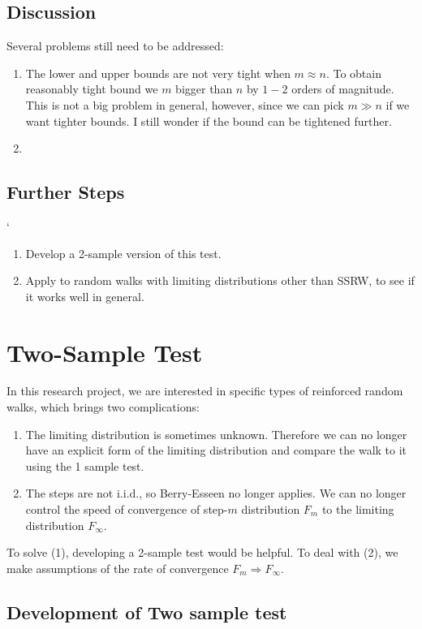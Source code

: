 \subsection*{Discussion}

Several problems still need to be addressed:
\begin{enumerate}
	\item The lower and upper bounds are not very tight when $m \approx n$. To obtain reasonably tight bound we $m$ bigger than $n$ by $1-2$ orders of magnitude. This is not a big problem in general, however, since we can pick $m \gg n$ if we want tighter bounds. I still wonder if the bound can be tightened further.
	\item 
\end{enumerate}


\subsection*{Further Steps}
`
\begin{enumerate}
	\item Develop a 2-sample version of this test.
	\item Apply to random walks with limiting distributions other than SSRW, to see if it works well in general.
\end{enumerate}

\section{Two-Sample Test}

In this research project, we are interested in specific types of reinforced random walks, which brings two complications:
\begin{enumerate}
	\item The limiting distribution is sometimes unknown. Therefore we can no longer have an explicit form of the limiting distribution and compare the walk to it using the 1 sample test.
	\item The steps are not i.i.d., so Berry-Esseen no longer applies. We can no longer control the speed of convergence of step-$m$ distribution $F_m$ to the limiting distribution $F_\infty $.
\end{enumerate}

To solve (1), developing a 2-sample test would be helpful. To deal with (2), we make assumptions of the rate of convergence $F_m \Rightarrow F_\infty$.

\subsection{Development of Two sample test}

